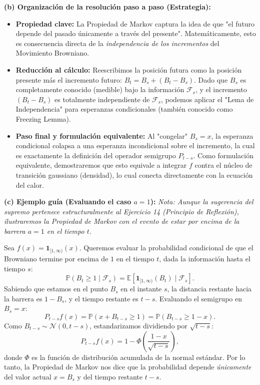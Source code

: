 \documentclass[11pt, letterpaper]{article}
\begin{document}
\vspace{5mm}

\begin{solucion}
    \textbf{(b) Organización de la resolución paso a paso (Estrategia):}
    \begin{itemize}
        \item[(i)] \textbf{Propiedad clave:} La Propiedad de Markov captura la idea de que "el futuro depende del pasado únicamente a través del presente". Matemáticamente, esto es consecuencia directa de la \textit{independencia de los incrementos} del Movimiento Browniano.
        \item[(ii)] \textbf{Reducción al cálculo:} Reescribimos la posición futura como la posición presente más el incremento futuro: $B_t = B_s + (B_t - B_s)$. Dado que $B_s$ es completamente conocido (medible) bajo la información $\mathcal{F}_s$, y el incremento $(B_t - B_s)$ es totalmente independiente de $\mathcal{F}_s$, podemos aplicar el "Lema de Independencia" para esperanzas condicionales (también conocido como Freezing Lemma).
        \item[(iii)] \textbf{Paso final y formulación equivalente:} Al "congelar" $B_s = x$, la esperanza condicional colapsa a una esperanza incondicional sobre el incremento, la cual es exactamente la definición del operador semigrupo $P_{t-s}$. Como formulación equivalente, demostraremos que esto equivale a integrar $f$ contra el núcleo de transición gaussiano (densidad), lo cual conecta directamente con la ecuación del calor.
    \end{itemize}

    \vspace{3mm}
    \textbf{(c) Ejemplo guía (Evaluando el caso $a=1$):}
    \textit{Nota: Aunque la sugerencia del supremo pertenece estructuralmente al Ejercicio 14 (Principio de Reflexión), ilustraremos la Propiedad de Markov con el evento de estar por encima de la barrera $a=1$ en el tiempo $t$.}
    
    Sea $f(x) = \mathbf{1}_{[1, \infty)}(x)$. Queremos evaluar la probabilidad condicional de que el Browniano termine por encima de $1$ en el tiempo $t$, dada la información hasta el tiempo $s$:
    \[ \mathbb{P}(B_t \ge 1 \mid \mathcal{F}_s) = \mathbb{E}[\mathbf{1}_{[1, \infty)}(B_t) \mid \mathcal{F}_s]. \]
    Sabiendo que estamos en el punto $B_s$ en el instante $s$, la distancia restante hacia la barrera es $1 - B_s$, y el tiempo restante es $t - s$. Evaluando el semigrupo en $B_s = x$:
    \[ P_{t-s}f(x) = \mathbb{P}(x + B_{t-s} \ge 1) = \mathbb{P}(B_{t-s} \ge 1 - x). \]
    Como $B_{t-s} \sim \mathcal{N}(0, t-s)$, estandarizamos dividiendo por $\sqrt{t-s}$:
    \[ P_{t-s}f(x) = 1 - \Phi\left( \frac{1 - x}{\sqrt{t-s}} \right), \]
    donde $\Phi$ es la función de distribución acumulada de la normal estándar. Por lo tanto, la Propiedad de Markov nos dice que la probabilidad depende \textit{únicamente} del valor actual $x = B_s$ y del tiempo restante $t-s$.


\end{solucion}
\end{document}

